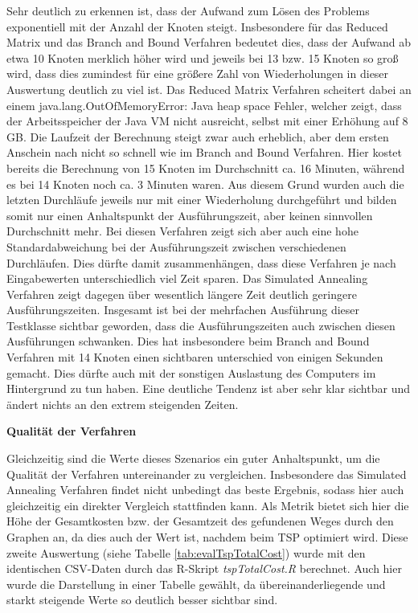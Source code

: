 Sehr deutlich zu erkennen ist, dass der Aufwand zum Lösen des Problems exponentiell mit der Anzahl der Knoten steigt. Insbesondere für das Reduced Matrix und das Branch and Bound Verfahren bedeutet dies, dass der Aufwand ab etwa 10 Knoten merklich höher wird und jeweils bei 13 bzw. 15 Knoten so groß wird, dass dies zumindest für eine größere Zahl von Wiederholungen in dieser Auswertung deutlich zu viel ist. Das Reduced Matrix Verfahren scheitert dabei an einem \glqq{}java.lang.OutOfMemoryError: Java heap space\grqq{} Fehler, welcher zeigt, dass der Arbeitsspeicher der Java VM nicht ausreicht, selbst mit einer Erhöhung auf 8 GB. Die Laufzeit der Berechnung steigt zwar auch erheblich, aber dem ersten Anschein nach nicht so schnell wie im Branch and Bound Verfahren. Hier kostet bereits die Berechnung von 15 Knoten im Durchschnitt ca. 16 Minuten, während es bei 14 Knoten noch ca. 3 Minuten waren. Aus diesem Grund wurden auch die letzten Durchläufe jeweils nur mit einer Wiederholung durchgeführt und bilden somit nur einen Anhaltspunkt der Ausführungszeit, aber keinen sinnvollen Durchschnitt mehr. Bei diesen Verfahren zeigt sich aber auch eine hohe Standardabweichung bei der Ausführungszeit zwischen verschiedenen Durchläufen. Dies dürfte damit zusammenhängen, dass diese Verfahren je nach Eingabewerten unterschiedlich viel Zeit sparen. Das Simulated Annealing Verfahren zeigt dagegen über wesentlich längere Zeit deutlich geringere Ausführungszeiten. Insgesamt ist bei der mehrfachen Ausführung dieser Testklasse sichtbar geworden, dass die Ausführungszeiten auch zwischen diesen Ausführungen schwanken. Dies hat insbesondere beim Branch and Bound Verfahren mit 14 Knoten einen sichtbaren unterschied von einigen Sekunden gemacht. Dies dürfte auch mit der sonstigen Auslastung des Computers im Hintergrund zu tun haben. Eine deutliche Tendenz ist aber sehr klar sichtbar und ändert nichts an den extrem steigenden Zeiten.




\textbf{Qualität der Verfahren}

Gleichzeitig sind die Werte dieses Szenarios ein guter Anhaltspunkt, um die Qualität der Verfahren untereinander zu vergleichen. Insbesondere das Simulated Annealing Verfahren findet nicht unbedingt das beste Ergebnis, sodass hier auch gleichzeitig ein direkter Vergleich stattfinden kann. Als Metrik bietet sich hier die Höhe der Gesamtkosten bzw. der Gesamtzeit des gefundenen Weges durch den Graphen an, da dies auch der Wert ist, nachdem beim TSP optimiert wird. Diese zweite Auswertung (siehe Tabelle \ref{tab:evalTspTotalCost}) wurde mit den identischen CSV-Daten durch das R-Skript \textit{tspTotalCost.R} berechnet. Auch hier wurde die Darstellung in einer Tabelle gewählt, da übereinanderliegende und starkt steigende Werte so deutlich besser sichtbar sind.

